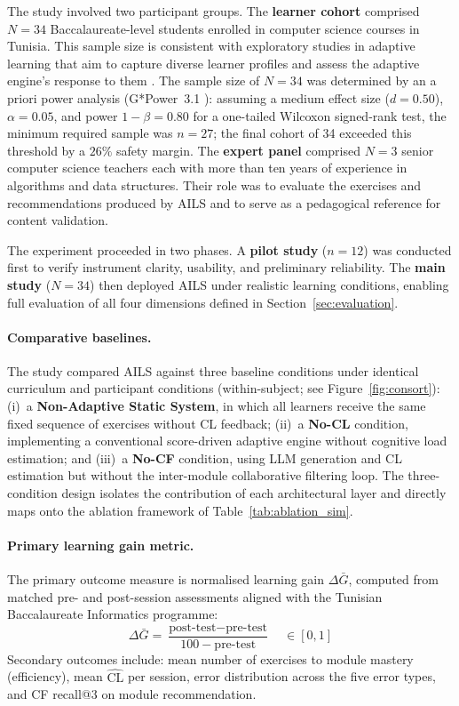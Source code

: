 \documentclass[ASNA,twocolumn]{USG} %
\begin{document}
The study involved two participant groups. The \textbf{learner cohort}
comprised $N{=}34$ Baccalaureate-level students enrolled in computer
science courses in Tunisia. This sample size is consistent with
exploratory studies in adaptive learning that aim to capture diverse
learner profiles and assess the adaptive engine's response to them
\cite{Paas2003}. The sample size of $N{=}34$ was determined by an
a priori power analysis (G*Power~3.1 \cite{Faul2007}): assuming a
medium effect size ($d{=}0.50$), $\alpha{=}0.05$, and power
$1{-}\beta{=}0.80$ for a one-tailed Wilcoxon signed-rank test, the
minimum required sample was $n{=}27$; the final cohort of 34 exceeded
this threshold by a $26\%$ safety margin.
The \textbf{expert panel} comprised $N{=}3$ senior
computer science teachers each with more than ten years of experience
in algorithms and data structures. Their role was to evaluate the
exercises and recommendations produced by AILS and to serve as a
pedagogical reference for content validation.

The experiment proceeded in two phases. A \textbf{pilot study}
($n{=}12$) was conducted first to verify instrument clarity, usability,
and preliminary reliability. The \textbf{main study} ($N{=}34$)
then deployed AILS under realistic learning conditions, enabling full
evaluation of all four dimensions defined in
Section~\ref{sec:evaluation}.

\paragraph{Comparative baselines.}
The study compared AILS against three baseline conditions under
identical curriculum and participant conditions (within-subject;
see Figure~\ref{fig:consort}):
(i)~a \textbf{Non-Adaptive Static System}, in which all learners
receive the same fixed sequence of exercises without CL feedback;
(ii)~a \textbf{No-CL} condition, implementing a conventional
score-driven adaptive engine without cognitive load estimation;
and (iii)~a \textbf{No-CF} condition, using LLM generation and CL
estimation but without the inter-module collaborative filtering loop.
The three-condition design isolates the contribution of each
architectural layer and directly maps onto the ablation framework of
Table~\ref{tab:ablation_sim}.

\paragraph{Primary learning gain metric.}
The primary outcome measure is normalised learning gain
$\Delta\bar{G}$, computed from matched pre- and post-session
assessments aligned with the Tunisian Baccalaureate Informatics
programme:
\begin{equation}
\label{eq:learning_gain}
\Delta\bar{G} = \frac{\text{post-test} - \text{pre-test}}{100 - \text{pre-test}}
\quad \in [0,1]
\end{equation}
Secondary outcomes include: mean number of exercises to module
mastery (efficiency), mean $\widehat{\text{CL}}$ per session, error
distribution across the five error types, and CF recall@3 on
module recommendation.
\end{document}
